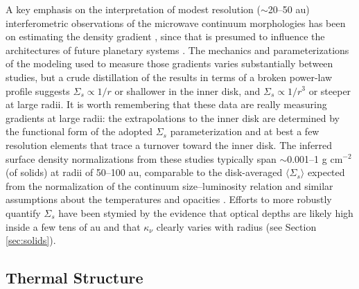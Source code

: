 \documentclass[a4paper]{ar-1col}
\begin{document}
A key emphasis on the interpretation of modest resolution ($\sim$20--50 au) interferometric observations of the microwave continuum morphologies has been on estimating the density gradient \citep{guilloteau98,aw07a,pietu07,andrews09,andrews10,isella09,pietu14}, since that is presumed to influence the architectures of future planetary systems \citep[e.g.,][]{miguel11}.  The mechanics and parameterizations of the modeling used to measure those gradients varies substantially between studies, but a crude distillation of the results in terms of a broken power-law profile suggests $\Sigma_s \propto 1/r$ or shallower in the inner disk, and $\Sigma_s \propto 1/r^3$ or steeper at large radii.  It is worth remembering that these data are really measuring gradients at large radii: the extrapolations to the inner disk are determined by the functional form of the adopted $\Sigma_s$ parameterization and at best a few resolution elements that trace a turnover toward the inner disk.  The inferred surface density normalizations from these studies typically span $\sim$0.001--1 g cm$^{-2}$ (of solids) at radii of 50--100 au, comparable to the disk-averaged $\langle \Sigma_s \rangle$ expected from the normalization of the continuum size--luminosity relation and similar assumptions about the temperatures and opacities \citep{tripathi17}.  Efforts to more robustly quantify $\Sigma_s$ have been stymied by the evidence that optical depths are likely high inside a few tens of au and that $\kappa_\nu$ clearly varies with radius (see Section \ref{sec:solids}).   







\subsection{Thermal Structure} \label{sec:temp}
\end{document}
